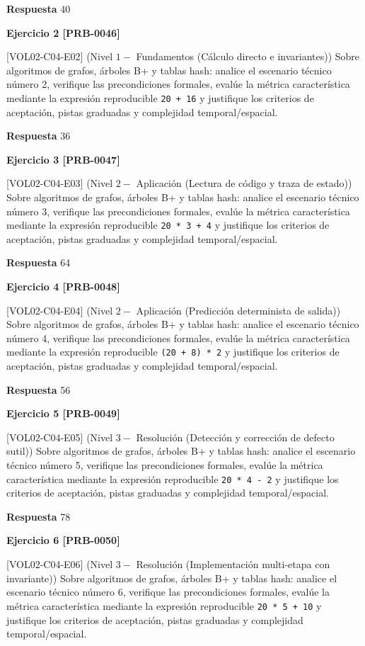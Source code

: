 \documentclass{book}
\begin{document}
\noindent\textbf{Respuesta} 40

\noindent\textbf{Ejercicio 2 [PRB-0046]}

[VOL02-C04-E02] (Nivel \(1 -\) Fundamentos (Cálculo directo e invariantes)) Sobre algoritmos de grafos, árboles B+ y tablas hash: analice el escenario técnico número 2, verifique las precondiciones formales, evalúe la métrica característica mediante la expresión reproducible \texttt{20 + 16} y justifique los criterios de aceptación, pistas graduadas y complejidad temporal/espacial.

\noindent\textbf{Respuesta} 36

\noindent\textbf{Ejercicio 3 [PRB-0047]}

[VOL02-C04-E03] (Nivel \(2 -\) Aplicación (Lectura de código y traza de estado)) Sobre algoritmos de grafos, árboles B+ y tablas hash: analice el escenario técnico número 3, verifique las precondiciones formales, evalúe la métrica característica mediante la expresión reproducible \texttt{20 * 3 + 4} y justifique los criterios de aceptación, pistas graduadas y complejidad temporal/espacial.

\noindent\textbf{Respuesta} 64

\noindent\textbf{Ejercicio 4 [PRB-0048]}

[VOL02-C04-E04] (Nivel \(2 -\) Aplicación (Predicción determinista de salida)) Sobre algoritmos de grafos, árboles B+ y tablas hash: analice el escenario técnico número 4, verifique las precondiciones formales, evalúe la métrica característica mediante la expresión reproducible \texttt{(20 + 8) * 2} y justifique los criterios de aceptación, pistas graduadas y complejidad temporal/espacial.

\noindent\textbf{Respuesta} 56

\noindent\textbf{Ejercicio 5 [PRB-0049]}

[VOL02-C04-E05] (Nivel \(3 -\) Resolución (Detección y corrección de defecto sutil)) Sobre algoritmos de grafos, árboles B+ y tablas hash: analice el escenario técnico número 5, verifique las precondiciones formales, evalúe la métrica característica mediante la expresión reproducible \texttt{20 * 4 - 2} y justifique los criterios de aceptación, pistas graduadas y complejidad temporal/espacial.

\noindent\textbf{Respuesta} 78

\noindent\textbf{Ejercicio 6 [PRB-0050]}

[VOL02-C04-E06] (Nivel \(3 -\) Resolución (Implementación multi-etapa con invariante)) Sobre algoritmos de grafos, árboles B+ y tablas hash: analice el escenario técnico número 6, verifique las precondiciones formales, evalúe la métrica característica mediante la expresión reproducible \texttt{20 * 5 + 10} y justifique los criterios de aceptación, pistas graduadas y complejidad temporal/espacial.
\end{document}
